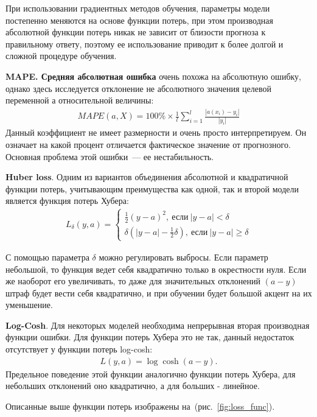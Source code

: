 \documentclass[12pt,a4paper]{article} %
\begin{document}
При использовании градиентных методов обучения, параметры модели постепенно меняются на основе функции потерь, при этом производная абсолютной функции потерь никак не зависит от близости прогноза к правильному ответу, поэтому ее использование приводит к более долгой и сложной процедуре обучения.

\textbf{MAPE. Средняя абсолютная ошибка} очень похожа на абсолютную ошибку, однако здесь исследуется отклонение не абсолютного значения целевой переменной а относительной величины:
\begin{gather}\label{linregdiffMAPE}
	MAPE(a, X) = 100\% \times \frac{1}{l}\sum\limits_{i=1}^{l}\frac{|a(x_i)-y_i|}{|y_i|}
\end{gather}
Данный коэффициент не имеет размерности и очень просто интерпретируем. Он означает на какой процент отличается фактическое значение от прогнозного. Основная проблема этой ошибки~--- ее нестабильность.

\textbf{Huber loss}. Одним из вариантов объединения абсолютной и квадратичной функции потерь, учитывающим преимущества как одной, так и второй модели является функция потерь Хубера:
\begin{gather}\label{linregdiff7}
	L_{\delta}(y,a) = \begin{cases}
	\frac{1}{2}(y-a)^2,~\text{если}~|y-a|<\delta
		\\
	\delta\left(|y-a|-\frac{1}{2}\delta\right),~\text{если}~|y-a|\geq\delta
	\end{cases}
\end{gather}

С помощью параметра $\delta$ можно регулировать выбросы. Если параметр небольшой, то функция ведет себя квадратично только в окрестности нуля. Если же наоборот его увеличивать, то даже для значительных отклонений $(a-y)$ штраф будет вести себя квадратично, и при обучении будет большой акцент на их уменьшение.

\textbf{Log-Cosh}. Для некоторых моделей необходима непрерывная вторая производная функции ошибки. Для функции потерь Хубера это не так, данный недостаток отсутствует у функции потерь log-cosh:
 \begin{gather}\label{linregdiff8}
 L(y,a) = \log\cosh(a-y).
 \end{gather}
Предельное поведение этой функции аналогично функции потерь Хубера, для небольших отклонений оно квадратично, а для больших - линейное.

Описанные выше функции потерь изображены на~(рис.~\ref{fig:loss_func}).
\end{document}
